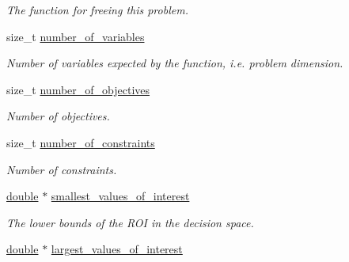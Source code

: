 \begin{DoxyCompactItemize}
\begin{DoxyCompactList}\small\item\em The function for freeing this problem. \end{DoxyCompactList}\item 
size\+\_\+t \hyperlink{structcoco__problem__s_afe459ff0b085d91aa3508a01a2093aca}{number\+\_\+of\+\_\+variables}\hypertarget{structcoco__problem__s_afe459ff0b085d91aa3508a01a2093aca}{}\label{structcoco__problem__s_afe459ff0b085d91aa3508a01a2093aca}

\begin{DoxyCompactList}\small\item\em Number of variables expected by the function, i.\+e. problem dimension. \end{DoxyCompactList}\item 
size\+\_\+t \hyperlink{structcoco__problem__s_a11621884788492371d54798fc432508b}{number\+\_\+of\+\_\+objectives}\hypertarget{structcoco__problem__s_a11621884788492371d54798fc432508b}{}\label{structcoco__problem__s_a11621884788492371d54798fc432508b}

\begin{DoxyCompactList}\small\item\em Number of objectives. \end{DoxyCompactList}\item 
size\+\_\+t \hyperlink{structcoco__problem__s_a767f2c6157c07cd28a0bad0bb6cf6915}{number\+\_\+of\+\_\+constraints}\hypertarget{structcoco__problem__s_a767f2c6157c07cd28a0bad0bb6cf6915}{}\label{structcoco__problem__s_a767f2c6157c07cd28a0bad0bb6cf6915}

\begin{DoxyCompactList}\small\item\em Number of constraints. \end{DoxyCompactList}\item 
\hyperlink{classdouble}{double} $\ast$ \hyperlink{structcoco__problem__s_ac8ee064f510932d0e6d6f8b2a4ddc3fa}{smallest\+\_\+values\+\_\+of\+\_\+interest}\hypertarget{structcoco__problem__s_ac8ee064f510932d0e6d6f8b2a4ddc3fa}{}\label{structcoco__problem__s_ac8ee064f510932d0e6d6f8b2a4ddc3fa}

\begin{DoxyCompactList}\small\item\em The lower bounds of the R\+OI in the decision space. \end{DoxyCompactList}\item 
\hyperlink{classdouble}{double} $\ast$ \hyperlink{structcoco__problem__s_a1d077fd9512d1af72943638c2d961358}{largest\+\_\+values\+\_\+of\+\_\+interest}\hypertarget{structcoco__problem__s_a1d077fd9512d1af72943638c2d961358}{}\label{structcoco__problem__s_a1d077fd9512d1af72943638c2d961358}


\end{DoxyCompactItemize}
